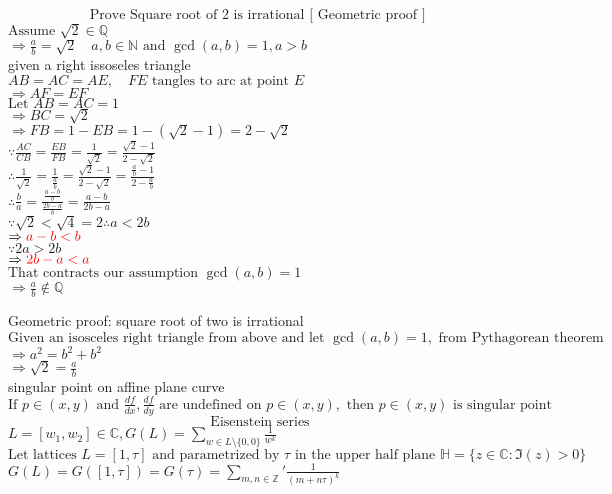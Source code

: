 \documentclass{book}
\begin{document}
\pagebreak
\noindent
\[ \text{Prove Square root of 2 is irrational} \text{ [ Geometric proof ] }\]
$\text{Assume } \sqrt{2} \in \mathbb{Q}$\\
$\Rightarrow \frac{a}{b} = \sqrt{2} \quad a, b \in \mathbb{N} \text{ and } \gcd(a, b) = 1, a > b$\\

given a right issoseles triangle\\
$AB = AC = AE, \quad FE \text{  tangles to arc at point } E $\\
$\Rightarrow AF = EF$\\
$\text{Let } AB = AC = 1$\\
$\Rightarrow BC = \sqrt{2}$\\
$\Rightarrow FB = 1-EB = 1-(\sqrt{2} - 1) = 2-\sqrt{2}$\\
$\because \frac{AC}{CB} = \frac{EB}{FB} = \frac{1}{\sqrt{2}} = \frac{\sqrt{2}-1}{2-\sqrt{2}}$\\
$\therefore \frac{1}{\sqrt{2}} =\frac{1}{\frac{a}{b}} = \frac{\sqrt{2}-1}{2-\sqrt{2}} = \frac{\frac{a}{b} - 1}{2-\frac{a}{b}}$\\
$\therefore \frac{b}{a} = \frac{ \frac{a-b}{b} } {\frac{2b - a}{b}} = \frac{a-b}{2b-a}$\\
$\because \sqrt{2} < \sqrt{4} = 2 \therefore  a < 2b $\\
$\Rightarrow  \color{red} a-b < b $\\
$\because 2a > 2b$\\
$\Rightarrow  \color{red}2b -a < a$\\
$\text{That contracts our assumption } \gcd(a, b) = 1$\\
$\Rightarrow \frac{a}{b} \notin \mathbb{Q}$

\pagebreak
\noindent
Geometric proof: square root of two is irrational\\
$\text{Given an isosceles right triangle from above and let } \gcd(a, b)=1, \text{ from Pythagorean theorem}$\\
$\Rightarrow a^2 = b^2 + b^2$\\
$\Rightarrow \sqrt{2} = \frac{a}{b}$\\

singular point on affine plane curve\\
$\text{If } p \in (x, y) \text{ and } \frac{df}{dx}, \frac{df}{dy} \text{ are undefined on } p \in (x, y), \text{ then } p\in (x, y) \text{ is singular point}$\\


\[\text{Eisenstein series}\]
$L = [w_1, w_2] \in \mathbb{C}, G(L) = \sum_{w\in L\setminus \{0, 0\}} \frac{1}{w^k}$\\
$\text{Let lattices } L=[1, \tau] \text{ and parametrized by }\tau  \text{ in the upper half plane } \mathbb{H} = \{ z \in\mathbb{C} : \Im(z) > 0 \} $\\
$G(L) = G([1, \tau]) =G(\tau) = \sum_{m, n \in \mathbb{Z}}' \frac{1}{(m+n\tau)^k}$\\
\end{document}
